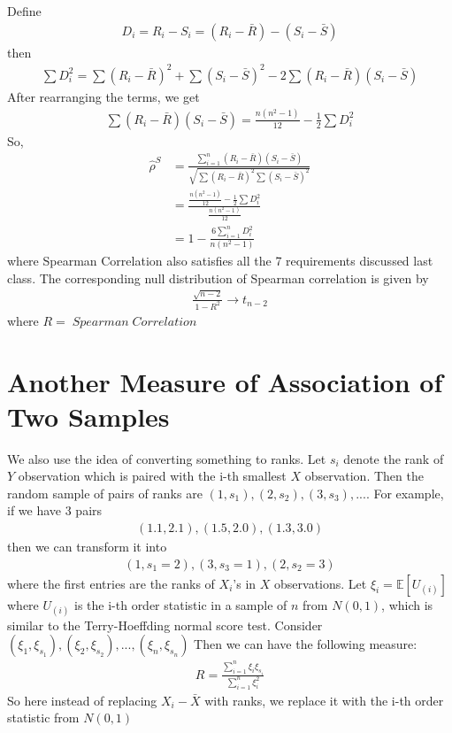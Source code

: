 \documentclass[twoside]{article}
\begin{document}
	Define
	\begin{align*}
		D_i = R_i - S_i = \left( R_i - \bar{R} \right) - \left( S_i - \bar{S} \right)
	\end{align*}
	then
	\begin{align*}
		\sum D_i^2 = \sum \left( R_i - \bar{R} \right)^2 + \sum \left( S_i - \bar{S} \right)^2 - 2 \sum \left( R_i - \bar{R} \right) \left( S_i - \bar{S} \right)
	\end{align*}
	After rearranging the terms, we get
	\begin{align*}
		\sum \left( R_i - \bar{R} \right) \left( S_i - \bar{S} \right) = \frac{n(n^2-1)}{12} - \frac{1}{2} \sum D_i^2
	\end{align*}
	So, 
	\begin{align*}
		\hat{\rho}^S &= \frac{\sum_{i=1}^{n} \left( R_i - \bar{R} \right) \left( S_i - \bar{S} \right)}{\sqrt{ \sum \left( R_i - \bar{R} \right)^2 \sum \left( S_i - \bar{S} \right)^2 }} \\
		&= \frac{\frac{n(n^2-1)}{12} - \frac{1}{2} \sum D_i^2}{\frac{n (n^2-1)}{12}} \\
		&= 1 - \frac{6 \sum_{i=1}^n D_i^2}{n (n^2 - 1)}
	\end{align*}
	where Spearman Correlation also satisfies all the 7 requirements discussed last class. The corresponding null distribution of Spearman correlation is given by
	\begin{align*}
		\frac{\sqrt{n-2}}{1 - R^2} \to t_{n-2}
	\end{align*}
	where $R = \; Spearman \; Correlation$
	\section{Another Measure of Association of Two Samples}
	We also use the idea of converting something to ranks. Let $s_i$ denote the rank of $Y$ observation which is paired with the i-th smallest $X$ observation. Then the random sample of pairs of ranks are $(1, s_1), (2, s_2), (3, s_3), ...$. For example, if we have 3 pairs
	\begin{align*}
		(1.1, 2.1), (1.5, 2.0), (1.3, 3.0)
	\end{align*}
	then we can transform it into 
	\begin{align*}
		(1, s_1 = 2), (3, s_3 = 1), (2, s_2 = 3)
	\end{align*}
	where the first entries are the ranks of $X_i$'s in $X$ observations. Let $\xi_i = \mathbb{E} \left[ U_{(i)} \right]$ where $U_{(i)}$ is the i-th order statistic in a sample of $n$ from $N(0,1)$, which is similar to the Terry-Hoeffding normal score test. Consider $(\xi_1, \xi_{s_1}), (\xi_2, \xi_{s_2}), ..., (\xi_n, \xi_{s_n})$ Then we can have the following measure: 
	\begin{align*}
		R = \frac{\sum_{i=1}^n \xi_i \xi_{s_i}}{\sum_{i=1}^{n} \xi_i^2}
	\end{align*}
	So here instead of replacing $X_i - \bar{X}$ with ranks, we replace it with the i-th order statistic from $N(0,1)$
\end{document}
